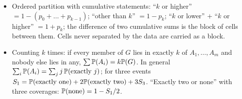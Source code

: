 \begin{itemize}[nosep]
      (``$X$ is one-fourth of $Y$ and $Z$ combined'' means $p_X = \tfrac14(p_Y + p_Z)$),
      set the sum of the multiples times $t$ equal to $1$, solve for $t$. Absolute
      statements (``$0.05$ less than'', ``$10\%$ of claims'') add a constant; the system
      stays linear.
\item Ordered partition with cumulative statements: ``$k$ or higher'' $= 1 - (p_0 + \dots +
      p_{k-1})$; ``other than $k$'' $= 1 - p_k$; ``$k$ or lower'' $+$ ``$k$ or higher''
      $= 1 + p_k$; the difference of two cumulative sums is the block of cells between
      them. Cells never separated by the data are carried as a block.
\item Counting $k$ times: if every member of $G$ lies in exactly $k$ of $A_1, \dots, A_m$
      and nobody else lies in any, $\sum \mathbb{P}(A_i) = k\mathbb{P}(G)$. In general
      $\sum_i \mathbb{P}(A_i) = \sum_j j\,\mathbb{P}(\text{exactly } j)$; for three events
      $S_1 = \mathbb{P}(\text{exactly one}) + 2\mathbb{P}(\text{exactly two}) + 3S_3$. ``Exactly
      two or none'' with three coverages: $\mathbb{P}(\text{none}) = 1 - S_1/2$.
\end{itemize}
